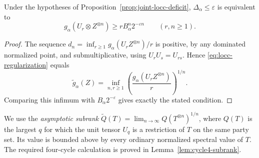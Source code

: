 \begin{proposition}
\label{prop:locc-uniform-lower-bound}
Under the hypotheses of Proposition~\ref{prop:joint-locc-deficit},
\(\Delta_\alpha\leq\varepsilon\) is equivalent to
\begin{equation}\label{eq:locc-uniform-lower-bound}
 g_\alpha(U_r\otimes Z^{\otimes n})
 \geq r B_\alpha^n2^{-\varepsilon n}\qquad(r,n\geq1).
\end{equation}
\end{proposition}
\begin{proof}
The sequence \(d_n=\inf_{r\geq1}g_\alpha(U_rZ^{\otimes n})/r\)
is positive, by any dominated normalized point, and submultiplicative,
using \(U_rU_s=U_{rs}\). Hence \eqref{eq:locc-regularization} equals
\[
 \widetilde g_\alpha(Z)=\inf_{n,r\geq1}
   \left(\frac{g_\alpha(U_rZ^{\otimes n})}{r}\right)^{1/n}.
\]
Comparing this infimum with \(B_\alpha2^{-\varepsilon}\) gives exactly
the stated condition.
\end{proof}





We use the \emph{asymptotic subrank}
$\widetilde Q(T)=\lim_{n\to\infty}Q(T^{\otimes n})^{1/n}$,
where $Q(T)$ is the largest $q$ for which the unit tensor $U_q$
is a restriction of $T$ on the same party set. Its value is bounded
above by every ordinary normalized spectral value of $T$.
The required four-cycle calculation is proved in
Lemma~\ref{lem:cycle4-subrank}.

